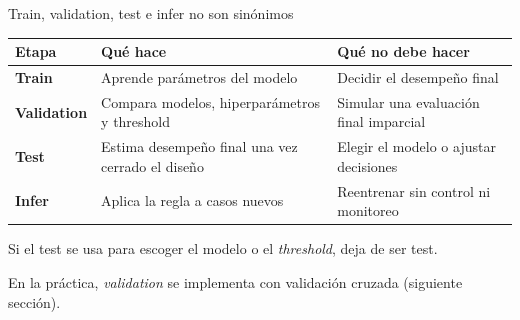 \documentclass[aspectratio=169,12pt]{beamer}
\newcommand{\hrow}{\rowcolor{mlcream}}
\begin{document}
\begin{frame}{Train, validation, test e infer no son sinónimos}
  \centering\footnotesize
  \begin{tabular}{@{}l L{0.43\textwidth} L{0.40\textwidth}@{}}
    \toprule
    \hrow \textbf{Etapa} & Qué hace & Qué no debe hacer \\
    \midrule
    \textbf{Train} & Aprende parámetros del modelo & Decidir el desempeño final \\
    \textbf{Validation} & Compara modelos, hiperparámetros y threshold & Simular una evaluación final imparcial \\
    \textbf{Test} & Estima desempeño final una vez cerrado el diseño & Elegir el modelo o ajustar decisiones \\
    \textbf{Infer} & Aplica la regla a casos nuevos & Reentrenar sin control ni monitoreo \\
    \bottomrule
  \end{tabular}
  \vspace{6pt}
  \begin{rulebox}
    Si el test se usa para escoger el modelo o el \emph{threshold}, deja de ser test.
  \end{rulebox}
  {\footnotesize En la práctica, \emph{validation} se implementa con validación cruzada (siguiente sección).}
\end{frame}
\end{document}
